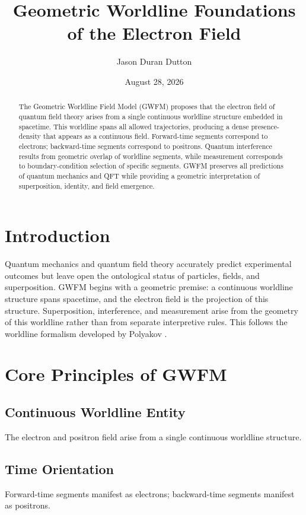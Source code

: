\documentclass[12pt]{article}
\title{Geometric Worldline Foundations of the Electron Field}
\author{Jason Duran Dutton}
\date{August 28, 2026}
\begin{document}
\maketitle

\begin{abstract}
The Geometric Worldline Field Model (GWFM) proposes that the electron field of quantum field
theory arises from a single continuous worldline structure embedded in spacetime. This worldline
spans all allowed trajectories, producing a dense presence-density that appears as a continuous field.
Forward-time segments correspond to electrons; backward-time segments correspond to positrons.
Quantum interference results from geometric overlap of worldline segments, while measurement
corresponds to boundary-condition selection of specific segments. GWFM preserves all predictions
of quantum mechanics and QFT while providing a geometric interpretation of superposition, identity,
and field emergence.
\end{abstract}

\section{Introduction}
Quantum mechanics and quantum field theory accurately predict experimental outcomes but leave open the
ontological status of particles, fields, and superposition. GWFM begins with a geometric premise: a continuous
worldline structure spans spacetime, and the electron field is the projection of this structure. Superposition,
interference, and measurement arise from the geometry of this worldline rather than from separate interpretive
rules. This follows the worldline formalism developed by Polyakov \cite{Polyakov1987}.

\section{Core Principles of GWFM}

\subsection{Continuous Worldline Entity}
The electron and positron field arise from a single continuous worldline structure.

\subsection{Time Orientation}
Forward-time segments manifest as electrons; backward-time segments manifest as positrons.
\end{document}
